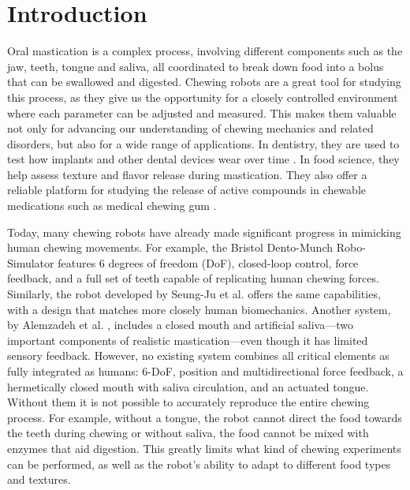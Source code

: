 \section{Introduction}


Oral mastication is a complex process, involving different components such as the jaw, teeth, tongue and saliva, all coordinated to break down food into 
a bolus that can be swallowed and digested. Chewing robots are a great tool for studying this process, as they give us the opportunity for a closely controlled environment where each parameter can be adjusted and measured. This makes them valuable not only for advancing our understanding of chewing mechanics and related disorders, but also for a wide range of applications. In dentistry, they are used to test how implants and other dental devices wear over time \cite{dental_application}. In food science, they help assess texture \cite{foodscience} and flavor release during mastication. They also offer a reliable platform for studying the release of active compounds in chewable medications such as medical chewing gum \cite{ChewingRobotGums}.

Today, many chewing robots have already made significant progress in mimicking human chewing movements.
For example, the Bristol Dento-Munch Robo-Simulator \cite{BristolChewingRobot} features 6 degrees of freedom 
(DoF), closed-loop control, force feedback, and a full set of teeth capable of replicating human chewing forces. Similarly, the robot developed by Seung-Ju 
et al. \cite{ChewingRobotLinearActuator} offers the same capabilities, with a design that matches more closely human biomechanics. Another system, by Alemzadeh 
et al. \cite{ChewingRobotGums}, includes a closed mouth and artificial saliva—two important components of realistic mastication—even though it has limited 
sensory feedback. However, no existing system combines all critical elements as fully integrated as humans: 6-DoF, position and multidirectional force feedback, a hermetically closed 
mouth with saliva circulation, and an actuated tongue. Without them it is not possible to accurately reproduce the entire chewing process. For example, without 
a tongue, the robot cannot direct the food towards the teeth during chewing or without saliva, the food cannot be mixed with enzymes that aid digestion. This greatly 
limits what kind of chewing experiments can be performed, as well as the robot's ability to adapt to different food types and textures.

